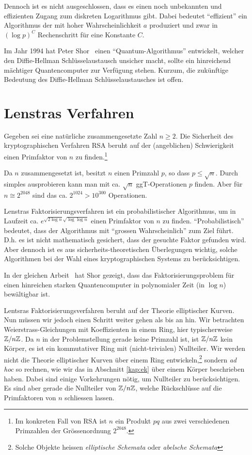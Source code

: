 Dennoch ist es nicht ausgeschlossen, dass es einen noch unbekannten
und effizienten Zugang zum diskreten Logarithmus gibt. Dabei bedeutet
``effizient'' ein Algorithmus der mit hoher Wahrscheinlichkeit $a$
produziert und zwar in $(\log p)^C$ Rechenschritt für eine Konstante
$C$.

Im Jahr 1994 hat Peter Shor~\cite{shor} einen ``Quantum-Algorithmus'' entwickelt,
welcher den Diffie-Hellman Schlüsselaustausch unsicher macht, sollte
ein hinreichend mächtiger Quantencomputer zur Verfügung stehen.
Kurzum, die zukünftige Bedeutung des Diffie-Hellman
Schlüsselaustausches ist offen.

\section{Lenstras Verfahren}

Gegeben sei eine natürliche zusammengesetzte Zahl $n\ge 2$.
Die Sicherheit des kryptographischen Verfahren RSA beruht auf der (angeblichen)
Schwierigkeit einen Primfaktor von $n$ zu finden.\footnote{Im
  konkreten Fall von RSA ist $n$ ein Produkt $pq$ aus zwei
  verschiedenen Primzahlen
  der Grössenordnung $2^{2048}$.}


Da $n$ zusammengesetzt ist, besitzt $n$ einen Primzahl $p$, so dass
$p\le \sqrt{n}$. Durch simples ausprobieren kann man mit ca. $\sqrt n$
ggT-Operationen $p$ finden. Aber für $n\cong 2^{2048}$ sind das ca.
$2^{1024}> 10^{300}$ Operationen. 

Lenstras Faktorisierungsverfahren ist ein probabilistischer
Algorithmus, um in Laufzeit ca. $e^{\sqrt{2\log n}\sqrt{\log\log n}}$
einen Primfaktor von $n$ zu finden. ``Probabilistisch'' bedeutet, dass
der Algorithmus mit ``grossen Wahrscheinlich'' zum Ziel führt. D.h. es
ist nicht mathematisch gesichert, dass der gesuchte Faktor gefunden
wird. Aber dennoch ist es aus sicherheits-theoretischen Überlegungen
wichtig, solche Algorithmen bei der Wahl eines kryptographischen
Systems zu berücksichtigen.

In der gleichen Arbeit~\cite{shor} hat Shor gezeigt, dass das
Faktorisierungsproblem für einen hinreichen starken Quantencomputer
in polynomialer Zeit (in $\log n$) bewältigbar ist.

Lentsras Faktorisierungsverfahren beruht auf der Theorie
elliptischer Kurven. Nun müssen wir jedoch einen Schritt weiter gehen
als bis an hin. Wir betrachten Weierstrass-Gleichungen mit
Koeffizienten in einem Ring, hier typischerweise ${\mathbb{Z}}/n{\mathbb{Z}}$. Da
$n$ in der Problemstellung gerade keine Primzahl ist, ist ${\mathbb{Z}}/n{\mathbb{Z}}$
kein Körper, es ist ein kommutativer Ring mit (nicht-trivialen)
Nullteiler. Wir werden nicht die Theorie elliptischer Kurven über
einem Ring entwickeln,\footnote{Solche Objekte heissen
  \emph{elliptische Schemata} oder \emph{abelsche Schemata}}
sondern  \textit{ad hoc} so rechnen, wie wir das in Abschnitt
\ref{kap:ek} über einem Körper beschrieben haben. Dabei sind einige
Vorkehrungen nötig, um Nullteiler zu berücksichtigen. Es sind aber
gerade die Nullteiler von ${\mathbb{Z}}/n{\mathbb{Z}}$, welche Rückschlüsse auf die
Primfaktoren von $n$ schliessen lassen.

